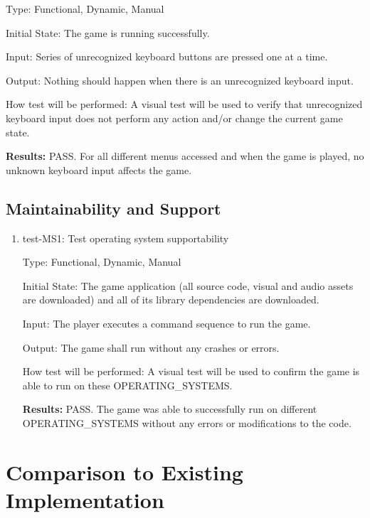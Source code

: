 \documentclass[12pt, titlepage]{article}
\begin{document}
\begin{enumerate}
Type: Functional, Dynamic, Manual
					
Initial State: The game is running successfully.

Input: Series of unrecognized keyboard buttons are pressed one at a time.
					
Output: Nothing should happen when there is an unrecognized keyboard input.
					
How test will be performed: A visual test will be used to verify that unrecognized keyboard input does not perform any action and/or change the current game state.

\textbf{Results:} PASS. For all different menus accessed and when the game is played, no unknown keyboard input affects the game. 

\end{enumerate}

\subsection{Maintainability and Support}

\begin{enumerate}
\item{test-MS1: Test operating system supportability\\}

Type: Functional, Dynamic, Manual
					
Initial State: The game application (all source code, visual and audio assets are downloaded) and all of its library dependencies are downloaded.

Input: The player executes a command sequence to run the game.
					
Output: The game shall run without any crashes or errors.
					
How test will be performed: A visual test will be used to confirm the game is able to run on these OPERATING\_SYSTEMS. 

\textbf{Results:} PASS. The game was able to successfully run on different OPERATING\_SYSTEMS without any errors or modifications to the code.

\end{enumerate}

	
\section{Comparison to Existing Implementation}	
\end{document}

